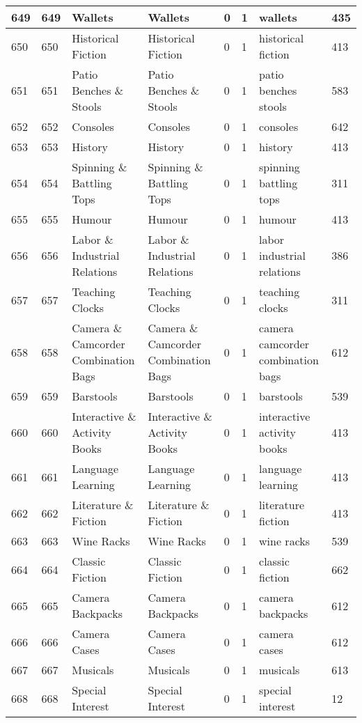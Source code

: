 \begin{longtable}{|l|l|l|l|l|l|l|l|}
649 & 649 & Wallets & Wallets & 0 & 1 & wallets & 435 \\ \hline 
650 & 650 & Historical Fiction & Historical Fiction & 0 & 1 & historical fiction & 413 \\ \hline 
651 & 651 & Patio Benches \& Stools & Patio Benches \& Stools & 0 & 1 & patio benches stools & 583 \\ \hline 
652 & 652 & Consoles & Consoles & 0 & 1 & consoles & 642 \\ \hline 
653 & 653 & History & History & 0 & 1 & history & 413 \\ \hline 
654 & 654 & Spinning \& Battling Tops & Spinning \& Battling Tops & 0 & 1 & spinning battling tops & 311 \\ \hline 
655 & 655 & Humour & Humour & 0 & 1 & humour & 413 \\ \hline 
656 & 656 & Labor \& Industrial Relations & Labor \& Industrial Relations & 0 & 1 & labor industrial relations & 386 \\ \hline 
657 & 657 & Teaching Clocks & Teaching Clocks & 0 & 1 & teaching clocks & 311 \\ \hline 
658 & 658 & Camera \& Camcorder Combination Bags & Camera \& Camcorder Combination Bags & 0 & 1 & camera camcorder combination bags & 612 \\ \hline 
659 & 659 & Barstools & Barstools & 0 & 1 & barstools & 539 \\ \hline 
660 & 660 & Interactive \& Activity Books & Interactive \& Activity Books & 0 & 1 & interactive activity books & 413 \\ \hline 
661 & 661 & Language Learning & Language Learning & 0 & 1 & language learning & 413 \\ \hline 
662 & 662 & Literature \& Fiction & Literature \& Fiction & 0 & 1 & literature fiction & 413 \\ \hline 
663 & 663 & Wine Racks & Wine Racks & 0 & 1 & wine racks & 539 \\ \hline 
664 & 664 & Classic Fiction & Classic Fiction & 0 & 1 & classic fiction & 662 \\ \hline 
665 & 665 & Camera Backpacks & Camera Backpacks & 0 & 1 & camera backpacks & 612 \\ \hline 
666 & 666 & Camera Cases & Camera Cases & 0 & 1 & camera cases & 612 \\ \hline 
667 & 667 & Musicals & Musicals & 0 & 1 & musicals & 613 \\ \hline 
668 & 668 & Special Interest & Special Interest & 0 & 1 & special interest & 12 \\ \hline 

\end{longtable}
